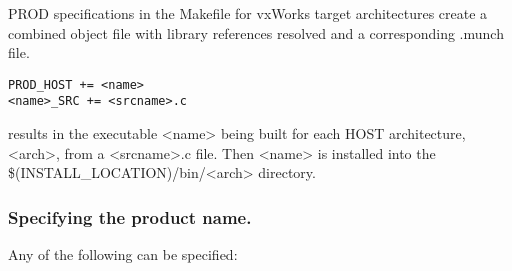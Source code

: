 PROD specifications in the Makefile for vxWorks target architectures create a combined object file with library 
references resolved and a corresponding .munch file.

\begin{verbatim}PROD_HOST += <name>
<name>_SRC += <srcname>.c
\end{verbatim}results in the executable \textless{}name\textgreater{} being built for each HOST architecture,  \textless{}arch\textgreater{}, from a \textless{}srcname\textgreater{}.c file. Then \textless{}name\textgreater{} 
is installed into the \$(INSTALL\_LOCATION)/bin/\textless{}arch\textgreater{} directory. 

\subsubsection{Specifying the product name.}

Any of the following can be specified:


